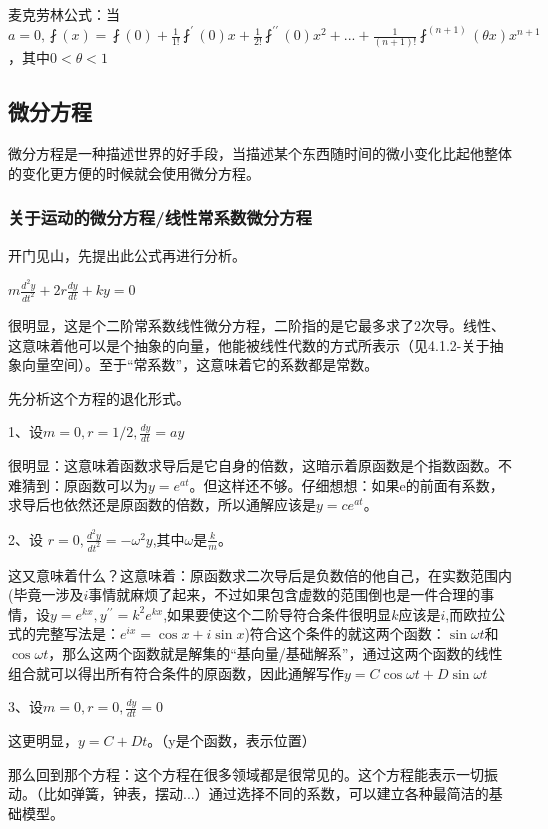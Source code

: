 \documentclass[UTF8]{ctexbook}
\newcommand{\derivative}{^\prime}
\newcommand{\doubleDerivative}{^{\prime\prime}}
\newcommand{\aLotDerivative}[1]{^{(#1)}}
\newcommand{\fDerivative}[1]{\fint\derivative(#1)}
\newcommand{\defFunction}[1]{\fint(#1)}
\begin{document}
{{{{麦克劳林公式：当$a = 0, \defFunction{x} = \defFunction{0} + \frac{1}{1!}\fDerivative{0}x + \frac{1}{2!}\fint\doubleDerivative(0)x^2 + ... + \frac{1}{(n + 1)!}\fint\aLotDerivative{n + 1}(\theta x)x^{n+1}$，其中$0 < \theta < 1$

}%

}%

\subsection{微分方程}{
微分方程是一种描述世界的好手段，当描述某个东西随时间的微小变化比起他整体的变化更方便的时候就会使用微分方程。

\subsubsection{关于运动的微分方程/线性常系数微分方程}{
开门见山，先提出此公式再进行分析。

$m\frac{d^2y}{dt^2} + 2r\frac{dy}{dt} + ky = 0$

很明显，这是个二阶常系数线性微分方程，二阶指的是它最多求了2次导。线性、这意味着他可以是个抽象的向量，他能被线性代数的方式所表示（见4.1.2-关于抽象向量空间）。至于“常系数”，这意味着它的系数都是常数。

先分析这个方程的退化形式。

1、设$m = 0, r = 1/2, \frac{dy}{dt} = ay$

很明显：这意味着函数求导后是它自身的倍数，这暗示着原函数是个指数函数。不难猜到：原函数可以为$y = e^{at}$。但这样还不够。仔细想想：如果e的前面有系数，求导后也依然还是原函数的倍数，所以通解应该是$y = ce^{at}$。

2、设 $r = 0, \frac{d^2y}{dt^2} = -\omega^2y$,其中$\omega$是$\frac{k}{m}$。

这又意味着什么？这意味着：原函数求二次导后是负数倍的他自己，在实数范围内(毕竟一涉及$i$事情就麻烦了起来，不过如果包含虚数的范围倒也是一件合理的事情，设$y=e^{kx},y\doubleDerivative = k^{2}e^{kx}$,如果要使这个二阶导符合条件很明显$k$应该是$i$,而欧拉公式的完整写法是：$e^{ix} = \cos x + i\sin x$)符合这个条件的就这两个函数：$\sin\omega t$和$\cos\omega t$，那么这两个函数就是解集的“基向量/基础解系”，通过这两个函数的线性组合就可以得出所有符合条件的原函数，因此通解写作$y = C\cos\omega t + D\sin\omega t$

3、设$m = 0, r = 0, \frac{dy}{dt} = 0$

这更明显，$y = C + Dt$。（y是个函数，表示位置）

那么回到那个方程：这个方程在很多领域都是很常见的。这个方程能表示一切振动。（比如弹簧，钟表，摆动...）通过选择不同的系数，可以建立各种最简洁的基础模型。

}}}}
\end{document}
